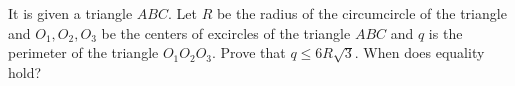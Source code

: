 It is given a triangle $ABC$. Let $R$ be the radius of the circumcircle of the triangle and $O_1,O_2,O_3$ be the centers of excircles of the triangle $ABC$ and $q$ is the perimeter of the triangle $O_1O_2O_3$. Prove that $q\le6R\sqrt3$. When does equality hold?